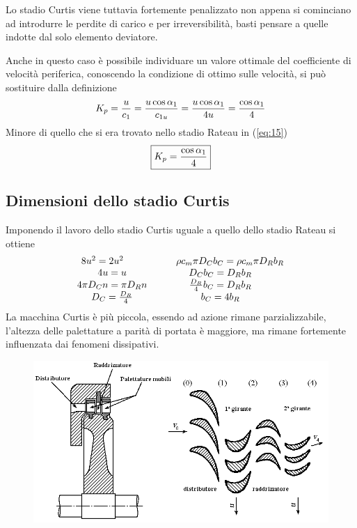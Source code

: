 \documentclass[a4paper, 15pt]{article}
\begin{document}
\begin{adjustwidth}{2in}{}
	Lo stadio Curtis viene tuttavia fortemente penalizzato non appena si cominciano ad introdurre le perdite di carico e per irreversibilità, basti pensare a quelle indotte dal solo elemento deviatore. \newline 
	
	Anche in questo caso è possibile individuare un valore ottimale del coefficiente di velocità periferica, conoscendo la condizione di ottimo sulle velocità, si può sostituire dalla definizione 
	\[K_p = {u\over c_1} = {u\cos\alpha_1\over c_{1u}} = \dfrac{u\cos\alpha_1}{4u} = {\cos\alpha_1\over4}\]
	Minore di quello che si era trovato nello stadio Rateau in (\ref{eq:15}) \
	\begin{equation}\label{eq:28}
		\boxed{K_p = {\cos\alpha_1\over4} }
	\end{equation}
\end{adjustwidth}

\subsection{Dimensioni dello stadio Curtis}
\begin{adjustwidth}{2in}{}	
	Imponendo il lavoro dello stadio Curtis uguale a quello dello stadio Rateau si ottiene 
	\[\begin{matrix}
		8u^2 = 2u^2 \qquad    & \qquad \rho c_m\pi D_Cb_C = \rho c_m\pi D_Rb_R \\
		4u = u                & D_Cb_C = D_Rb_R                                \\
		4\pi D_C n = \pi D_Rn & {D_R\over4}b_C = D_Rb_R                        \\
		D_C = {D_R\over4}     & b_C = 4b_R
	\end{matrix}\]
	La macchina Curtis è più piccola, essendo ad azione rimane parzializzabile, l'altezza delle palettature a parità di portata è maggiore, ma rimane fortemente influenzata dai fenomeni dissipativi.
	\begin{figure}[H]
		\centering
		\includegraphics[width=0.7\linewidth]{immagini/curtis}
		\label{fig:curtis}
	\end{figure}
	
\end{adjustwidth}
\end{document}
